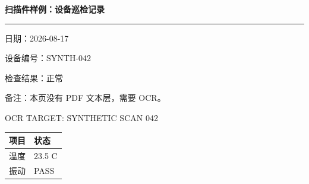 \documentclass[12pt,a4paper]{article}
\begin{document}
{\fontsize{25}{30}\selectfont\bfseries 扫描件样例：设备巡检记录}\par\vspace{5mm}\rule{\textwidth}{1pt}\par\vspace{12mm}
{\fontsize{16}{20}\selectfont 日期：2026-08-17}\par\vspace{8mm}
{\fontsize{16}{20}\selectfont 设备编号：SYNTH-042}\par\vspace{8mm}
{\fontsize{16}{20}\selectfont 检查结果：正常}\par\vspace{8mm}
{\fontsize{16}{20}\selectfont 备注：本页没有 PDF 文本层，需要 OCR。}\par\vspace{18mm}
{\fontsize{16}{20}\selectfont\ttfamily OCR TARGET: SYNTHETIC SCAN 042}\par\vspace{16mm}
\begin{tabular}{|p{55mm}|p{65mm}|}\hline
\textbf{项目} & \textbf{状态}\\\hline
温度 & 23.5 C\\\hline
振动 & PASS\\\hline
\end{tabular}
\vfill\color{gray}{\small Synthetic scan fixture - image-only PDF}
\end{document}
